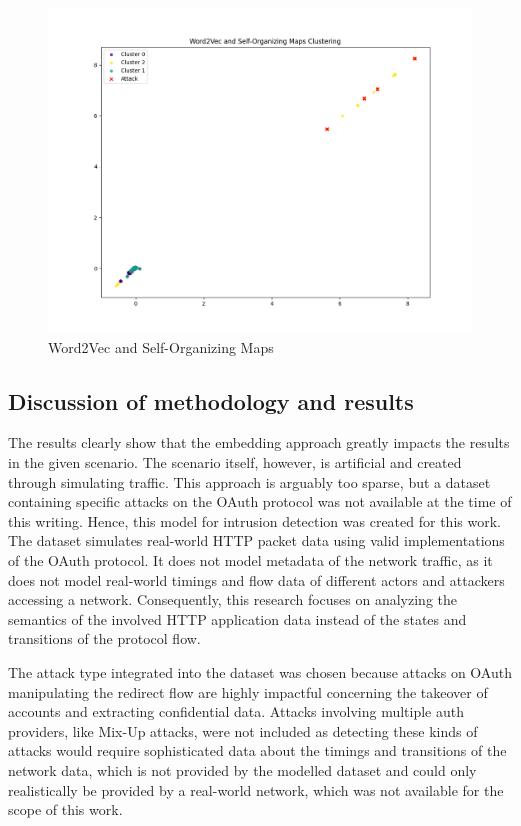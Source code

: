 \begin{figure}[H]
	\caption{Word2Vec and Self-Organizing Maps}
	\label{fig:som_clusters}
	\sffamily\footnotesize
	\includegraphics[width=1\textwidth]{pic/som_final.png}
	\unitlength=0.75mm
	\linethickness{0.4pt}
\end{figure}


\subsection{Discussion of methodology and results}
\label{subsec:results_discussion}

The results clearly show that the embedding approach greatly impacts the results in the given scenario. The scenario itself, however, is artificial and created through simulating traffic. This approach is arguably too sparse, but a dataset containing specific attacks on the OAuth protocol was not available at the time of this writing. Hence, this model for intrusion detection was created for this work. The dataset simulates real-world HTTP packet data using valid implementations of the OAuth protocol. It does not model metadata of the network traffic, as it does not model real-world timings and flow data of different actors and attackers accessing a network. Consequently, this research focuses on analyzing the semantics of the involved HTTP application data instead of the states and transitions of the protocol flow. 

The attack type integrated into the dataset was chosen because attacks on OAuth manipulating the redirect flow are highly impactful concerning the takeover of accounts and extracting confidential data. Attacks involving multiple auth providers, like Mix-Up attacks, were not included as detecting these kinds of attacks would require sophisticated data about the timings and transitions of the network data, which is not provided by the modelled dataset and could only realistically be provided by a real-world network, which was not available for the scope of this work.

